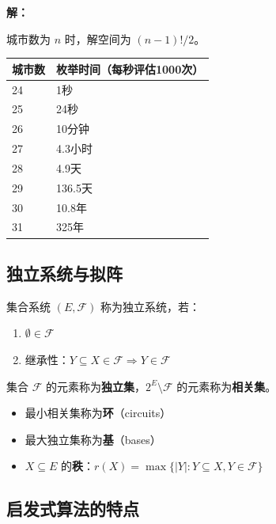 \begin{example}[TSP问题的计算复杂度]
\textbf{解：}

城市数为 $n$ 时，解空间为 $(n-1)!/2$。

\begin{table}[htbp]
\centering
\begin{tabular}{@{}ll@{}}
\toprule
\textbf{城市数} & \textbf{枚举时间}（每秒评估1000次） \\
\midrule
24 & 1秒 \\
25 & 24秒 \\
26 & 10分钟 \\
27 & 4.3小时 \\
28 & 4.9天 \\
29 & 136.5天 \\
30 & 10.8年 \\
31 & 325年 \\
\bottomrule
\end{tabular}
\end{table}
\end{example}

\subsection{独立系统与拟阵}

\begin{definition}[独立系统]
集合系统 $(E, \mathcal{F})$ 称为独立系统，若：
\begin{enumerate}[label=(\arabic*)]
    \item $\emptyset \in \mathcal{F}$
    \item 继承性：$Y \subseteq X \in \mathcal{F} \Rightarrow Y \in \mathcal{F}$
\end{enumerate}
集合 $\mathcal{F}$ 的元素称为\textbf{独立集}，$2^E \setminus \mathcal{F}$ 的元素称为\textbf{相关集}。
\end{definition}

\begin{definition}[基与秩]
\begin{itemize}[itemsep=0.3em]
    \item 最小相关集称为\textbf{环}（circuits）
    \item 最大独立集称为\textbf{基}（bases）
    \item $X \subseteq E$ 的\textbf{秩}：$r(X) = \max\{|Y| : Y \subseteq X, Y \in \mathcal{F}\}$
\end{itemize}
\end{definition}

\subsection{启发式算法的特点}

